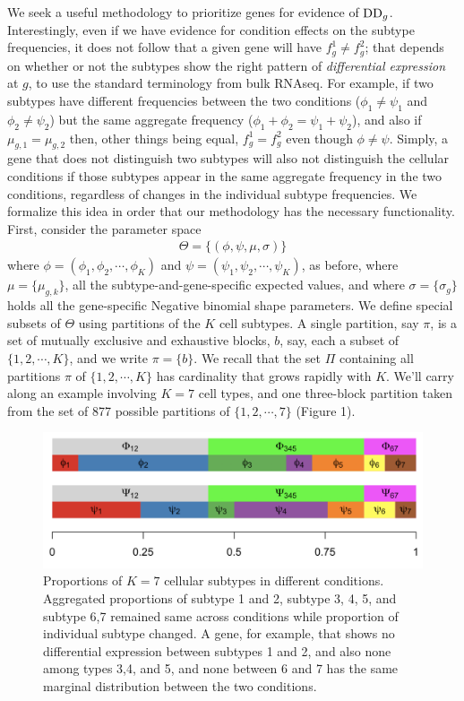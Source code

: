 \documentclass[11pt]{amsart}
\begin{document}
We seek a useful methodology to prioritize genes for evidence
of ${\rm DD}_g$.  Interestingly, even if we have evidence for condition effects
on the subtype frequencies, it does not follow that a given
gene will have $f^1_g \neq f^2_g$; that depends on whether or not the subtypes
show the right pattern of {\em differential expression} at $g$, to use the 
standard terminology from bulk RNAseq.  For example, if two subtypes have 
different frequencies between the two conditions ($\phi_1 \neq \psi_1$ and 
 $\phi_2 \neq \psi_2$) but the same aggregate frequency
($\phi_1+\phi_2 = \psi_1 + \psi_2$),  and also  if $\mu_{g,1} = \mu_{g,2}$
then, other things being equal, $f^1_g = f^2_g$ even though $\phi \neq \psi$.
Simply, a gene that does not distinguish two subtypes will also not distinguish
the cellular conditions if those subtypes appear in the same aggregate frequency
in the two conditions, regardless of changes in the individual subtype 
frequencies. We formalize this idea in order that our methodology
has the necessary functionality.  First, consider the parameter space 
\begin{eqnarray*}
\Theta = \{ (\phi, \psi,\mu, \sigma)  \}
\end{eqnarray*}
where $\phi=(\phi_1, \phi_2, \cdots, \phi_K)$ and $\psi=(\psi_1, \psi_2, \cdots, \psi_K)$,
as before, where $\mu = \{ \mu_{g,k} \}$, all the subtype-and-gene-specific expected
values, and where $\sigma = \{ \sigma_g \}$ holds all the gene-specific Negative binomial
shape parameters.  We define special subsets of $\Theta$ using
partitions of the $K$ cell subtypes.  A single partition, say $\pi$, is a set of
mutually exclusive and exhaustive blocks, $b$, say, each a subset of $\{1, 2, 
\cdots, K\}$, and we write $\pi = \{ b \}$.  We recall 
that the set $\Pi$ containing all partitions $\pi$ of $\{1,2, \cdots, K\}$
has cardinality that grows rapidly with $K$. 
 We'll carry along an example
involving $K=7$ cell types, and one three-block partition taken
from the set of 877 possible partitions of $\{1, 2, \cdots, 7\}$ (Figure 1).
\begin{figure}[h!]
  \includegraphics[width=\linewidth]{prop.png}
  \caption{Proportions of $K=7$ cellular subtypes in different conditions. 
 Aggregated proportions of subtype 1 and 2, subtype 3, 4, 5, and subtype 6,7 remained same across conditions while proportion of individual subtype changed. A gene, for example, that shows no differential 
expression between subtypes 1 and 2, and also none among types 3,4, and 5, and none between 6 and 7
 has the same marginal distribution between the two conditions.}
  \label{fig:1}
\end{figure}
\end{document}
